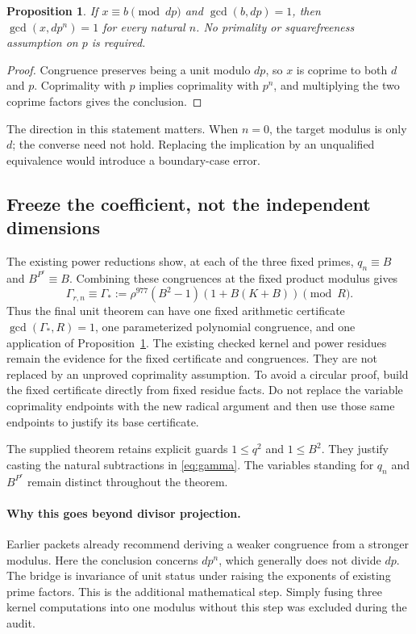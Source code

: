 \documentclass[11pt]{article}
\newcommand{\code}[1]{\texttt{\detokenize{#1}}}
\newtheorem{proposition}{Proposition}[section]
\begin{document}
\begin{proposition}\label{prop:thicken}
If \(x\equiv b\pmod{dp}\) and \(\gcd(b,dp)=1\), then
\(\gcd(x,dp^n)=1\) for every natural \(n\).
No primality or squarefreeness assumption on \(p\) is required.
\end{proposition}
\begin{proof}
Congruence preserves being a unit modulo \(dp\), so \(x\) is coprime to
both \(d\) and \(p\). Coprimality with \(p\) implies coprimality with
\(p^n\), and multiplying the two coprime factors gives the conclusion.
\end{proof}

The direction in this statement matters. When \(n=0\), the target modulus
is only \(d\); the converse need not hold. Replacing the implication by an
unqualified equivalence would introduce a boundary-case error.

\subsection{Freeze the coefficient, not the independent dimensions}

The existing power reductions show, at each of the three fixed primes,
\(q_n\equiv B\) and \(B^{P^r}\equiv B\). Combining these congruences at the
fixed product modulus gives
\[
\Gamma_{r,n}\equiv
\Gamma_*:=\rho^{977}(B^2-1)(1+B(K+B))\pmod R.
\]
Thus the final unit theorem can have one fixed arithmetic certificate
\(\gcd(\Gamma_*,R)=1\), one parameterized polynomial congruence, and one
application of Proposition~\ref{prop:thicken}. The existing checked kernel
and power residues remain the evidence for the fixed certificate and
congruences. They are not replaced by an unproved coprimality assumption. To avoid a
circular proof, build the fixed certificate directly from fixed residue
facts. Do not replace the variable coprimality endpoints with the new
radical argument and then use those same endpoints to justify its base
certificate.

The supplied \code{rankFactor_cast_congr} theorem retains explicit guards
\(1\leq q^2\) and \(1\leq B^2\). They justify casting the natural
subtractions in \eqref{eq:gamma}. The variables standing for \(q_n\) and
\(B^{P^r}\) remain distinct throughout the theorem.

\paragraph{Why this goes beyond divisor projection.}
Earlier packets already recommend deriving a weaker congruence from a
stronger modulus. Here the conclusion concerns \(dp^n\), which generally
does not divide \(dp\). The bridge is invariance of unit status under
raising the exponents of existing prime factors. This is the additional
mathematical step. Simply fusing three kernel computations into one modulus
without this step was excluded during the audit.
\end{document}
